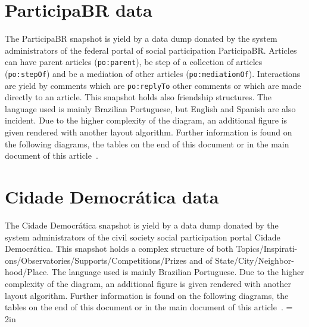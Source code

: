 \documentclass[review]{elsarticle}
\newcommand{\textttt}[1] {\texttt{\footnotesize#1}}
\begin{document}
\section{ParticipaBR data}
The ParticipaBR snapshot is yield by a data dump donated by the system
administrators of the federal portal of social participation ParticipaBR.
Articles can have parent articles (\textttt{po:parent}), be step of a
collection of articles (\textttt{po:stepOf}) and be a mediation of other
articles (\textttt{po:mediationOf}).
Interactions are yield by comments which are \textttt{po:replyTo} other
comments or which are made directly to an article.
This snapshot holds also friendship structures.
The language used is mainly Brazilian Portuguese, but English and
Spanish are also incident.
Due to the higher complexity of the diagram, an additional figure is
given rendered with another layout algorithm.
Further information is found on the following diagrams, the tables on
the end of this document or in the main document of this
article~\cite{losd}.

\section{Cidade Democrática data}
The Cidade Democrática snapshot is yield by a data dump donated by the system
administrators of the civil society social participation portal Cidade
Democrática.
This snapshot holds a complex structure of both
Topics/Inspirati-ons/Observatories/Supports/Competitions/Prizes
and of State/City/Neighbor-hood/Place.
The language used is mainly Brazilian Portuguese.
Due to the higher complexity of the diagram, an additional figure is
given rendered with another layout algorithm.
Further information is found on the following diagrams, the tables on
the end of this document or in the main document of this
article~\cite{losd}.
\textheight = 2in
\pdfpageheight 5in
\end{document}
